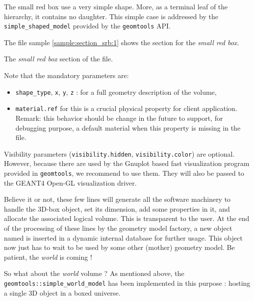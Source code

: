 \pn The  small red box  use a very  simple shape. More, as  a terminal
leaf of  the hierarchy, it contains  no daughter. This  simple case is
addressed  by  the   \texttt{simple\_shaped\_model}  provided  by  the
\texttt{geomtools} API.

\pn The file sample \ref{sample:section_srb:1} shows
the section for the \emph{small red box}.

\begin{sample}[h]
\caption{The \emph{small red box}
  section of the   file.}
\label{sample:section_srb:1}
\end{sample}

\pn Note that the mandatory parameters are:
\begin{itemize}

\item \texttt{shape\_type}, \texttt{x}, \texttt{y}, \texttt{z} : for a
  full geometry description of the volume,

\item \texttt{material.ref}  for this  is a crucial  physical property
  for client application.\\ Remark:  this behavior should be change in
  the  future to support,  for debugging  purpose, a  default material
  when this property is missing in the file.
\end{itemize}

\pn       Visibility      parameters      (\texttt{visibility.hidden},
\texttt{visibility.color}) are  optional.  However, because  there are
used  by the  Gnuplot  based fast  visualization  program provided  in
\texttt{geomtools}, we recommend to use them. They will also be passed
to the GEANT4 Open-GL visualization driver.

\pn Believe it or not, these  few lines will generate all the software
machinery to  handle the  3D-box object, set  its dimension,  add some
properties in it, and allocate  the associated logical volume. This is
transparent to the  user. At the end of the  processing of these lines
by the geometry model factory, a new object named 
is inserted  in a  dynamic internal database  for further  usage. This
object now just has to wait to be used by some other (mother) geometry
model. Be patient, the \emph{world} is coming !

\pn So  what about the \emph{world}  volume ? As  mentioned above, the
\texttt{geomtools::simple\_world\_model} has  been implemented in this
purpose : hosting a single 3D object in a boxed universe.

